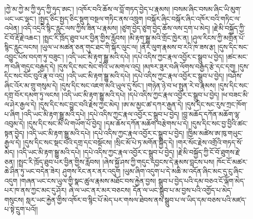 \documentclass{article}
\begin{document}
།ཀྱེ་མ་ཀྱེ་མ་ཀྱི་ཧུད་ཀྱི་ཧུད་ཨང་། །འཁོར་བའི་ཆོས་ལ་བློ་གཏད་བྱེད་པ་རྣམས། །བསམ་ཞིང་བསམ་ཞིང་ཡི་མུག་ཡང་ཡང་ལྡང་། །སྤྱད་ཅིང་སྤྱད་ཅིང་སྡུག་བསྔལ་གཏིང་ནས་འཁྲུག །བསྐོར་ཞིང་བསྐོར་ཞིང་འཁོར་བའི་གཏིང་ལ་འཕེན། །འདི་འདྲའི་སྙིང་རླུང་ལས་ཀྱིས་ཟིན་པ་རྣམས། །ཙུག་བྱེད་ཙུག་བྱེད་ཆོས་ལས་དྲག་པ་མེད། །རྗེ་མི་བསྐྱོད་ཀྱི་ངོ་བོ་རྡོ་རྗེ་འཆང་། །སྤྲང་རི་ཁྲོད་ཐུབ་པར་བྱིན་གྱིས་རློབས། །མི་རྟག་སྒྱུ་མའི་གྲོང་ཁྱེར་ན། །ཤུལ་རིངས་ཀྱི་མགྲོན་པོ་སྙིང་རླུང་ལངས། །ཡུལ་ཡ་མཚན་ཅན་གུང་ཐང་གི་སྐོར་ལུང་ལ། །ནོར་ལུག་རྣམས་བ་རའི་ཁ་ཟས་རྩ། །དུས་དིང་སང་འབྱུང་པོས་བདག་ཏུ་བཟུང་། །འདི་ཡང་མི་རྟག་སྒྱུ་མའི་དཔེ། །དཔེ་འདིས་ཀྱང་རྣལ་འབྱོར་ང་སྒྲུབ་པ་བྱེད། །ཚང་མང་ཀ་བཞི་གདུང་བརྒྱད་དེ། །དུས་དིང་སང་སེང་གེའི་ཡ་མགལ་འདྲ། །མཁར་ཟུར་བཞི་ལོགས་བརྒྱད་རྩེ་དང་དགུ། །དུས་དིང་སང་བོང་བུའི་རྣ་བ་འདྲ། །འདི་ཡང་མི་རྟག་སྒྱུ་མའི་དཔེ། །དཔེ་འདིས་ཀྱང་རྣལ་འབྱོར་ང་སྒྲུབ་པ་བྱེད། །བཤོས་ཞིང་འོར་མ་གྲུ་གསུམ་དེ། །དུས་དིང་སང་འཇག་མའི་ཡུལ་དུ་སོང་། །གཉེན་ཉེ་བ་ཕ་སྤུན་རེ་བ་རྣམས། །དུས་དིང་སང་དགྲ་བོར་དམག་ཏུ་ལངས། །འདི་ཡང་མི་རྟག་སྒྱུ་མའི་དཔེ། །དཔེ་འདིས་ཀྱང་རྣལ་འབྱོར་ང་སྒྲུབ་པ་བྱེད། །ཕ་བཟང་མི་ལ་ཤེར་རྒྱལ་དེ། །དུས་དིང་སང་བྱུང་བའི་རྗེས་ཀྱང་མེད། །ཨ་མ་མྱང་ཚ་དཀར་རྒྱན་དེ། །དུས་དིང་སང་རུས་ཀྲང་ཁོག་པ་ཞིག །འདི་ཡང་མི་རྟག་སྒྱུ་མའི་དཔེ། །དཔེ་འདིས་ཀྱང་རྣལ་འབྱོར་ང་སྒྲུབ་པ་བྱེད། །བླ་མཆོད་དཀོན་མཆོག་ལྷ་འབུམ་དེ། །དུས་དིང་སང་མི་ཡི་གཡོག་པོ་བྱེད། །དམ་ཆོས་དཀོན་མཆོག་བརྩེགས་པ་དེ། །དུས་དིང་སང་བྱ་བྱིའི་ཚང་སྟན་བྱེད། །འདི་ཡང་མི་རྟག་སྒྱུ་མའི་དཔེ། །དཔེ་འདིས་ཀྱང་རྣལ་འབྱོར་ང་སྒྲུབ་པ་བྱེད། །ཁྱིམ་མཚེས་ཨ་ཁུ་གཡུང་རྒྱལ་དེ། །དུས་དིང་སང་སྡང་བའི་དགྲ་དང་བསྡོངས། །སྲིང་མོ་པེ་ཏ་མགོན་སྐྱིད་དེ། །གར་སོང་རྗེས་འགྲོའི་གཏད་སོ་མེད། །འདི་ཡང་མི་རྟག་སྒྱུ་མའི་དཔེ། །དཔེ་འདིས་ཀྱང་རྣལ་འབྱོར་ང་སྒྲུབ་པ་བྱེད། །རྗེ་མི་བསྐྱོད་ཀྱི་ངོ་བོ་ཐུགས་རྗེ་ཅན། །སྤྲང་རི་ཁྲོད་ཐུབ་པར་བྱིན་གྱིས་རློབས། །ཞེས་སྐྱོ་ཤས་ཀྱི་གདུང་དབྱངས་དེ་རྣམས་བླངས་པས། ཁོང་ངོ་མཚར་ཆེ་ཤིན་ཏུ་ཡང་བདེན་ཟེར། ཤུགས་རིང་ནར་ནར་འདུག །ཡུམ་ཞིག་འདུག་པ་དེ་མཆི་མ་འདོན་ཞིང་མང་དུ་ངུ་ཞིང་འདུག །གཞན་ཡང་ངས་ཡུལ་གྱི་སྣང་ཚུལ་རྣམས་མཐོང་བས་རྐྱེན་བྱས། སྒྲུབ་པ་བྱེད་པའི་དམ་བཅའ་ངོ་ལྐོག་མེད་པར་ཁ་ནས་ཀྱང་མང་དུ་ཤོར། ཞེ་ལ་ཡང་ནར་མར་བཅངས། དོན་ལ་ཡང་སྒྲུབ་པ་མ་བྱས་པའི་འགྱོད་པ་མེད་གསུངས། སླར་ཡང་རྐྱེན་གྱིས་འཁོར་བ་སྙིང་པོ་མེད་པར་གསལ་ཐེབས་ནས་སྒྲུབ་པ་ལ་ཡིད་དམ་བཅས་པའི་མཛད་པ་སྟེ་དྲུག་པའོ།།
\end{document}

